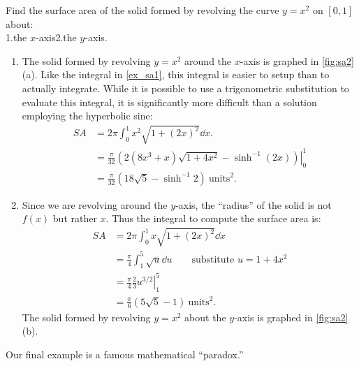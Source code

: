 \begin{example}\label{ex_sa2}%
Find the surface area of the solid formed by revolving the curve $y=x^2$ on $[0,1]$ about:\\
\null\hfill 1.\quad the $x$-axis\hfill2.\quad the $y$-axis.\hfill\null
\solution
\begin{enumerate}
	\item		The solid formed by revolving $y=x^2$ around the $x$-axis is graphed in \autoref{fig:sa2}(a). Like the integral in \autoref{ex_sa1}, this integral is easier to setup than to actually integrate. While it is possible to use a trigonometric substitution to evaluate this integral, it is significantly more difficult than a solution employing the hyperbolic sine:
\begin{align*}
	SA &= 2\pi\int_0^1 x^2\sqrt{1+(2x)^2}\dd x. \\
	&= \left.\frac{\pi}{32}\left(2(8x^3+x)\sqrt{1+4x^2}-\sinh^{-1}(2x)\right)\right|_0^1\\
	&=\frac{\pi}{32}\left(18\sqrt{5}-\sinh^{-1}2\right)\ \text{units}^2.
\end{align*}

	\item	 Since we are revolving around the $y$-axis, the ``radius'' of the solid is not $f(x)$ but rather $x$. Thus the integral to compute the surface area is:
\begin{align*}
	SA &= 2\pi\int_0^1x\sqrt{1+(2x)^2}\dd x \\
	&=	\frac{\pi}4\int_1^5 \sqrt{u}\dd u \qquad\text{substitute $u=1+4x^2$} \\
	&= \left.\frac{\pi}{4}\frac23 u^{3/2}\right|_1^5\\
	&= \frac{\pi}6\left(5\sqrt{5}-1\right)\ \text{units}^2.
\end{align*}
 The solid formed by revolving $y=x^2$ about the $y$-axis is graphed in \autoref{fig:sa2} (b).
\end{enumerate}
\end{example}

Our final example is a famous mathematical ``paradox.''

